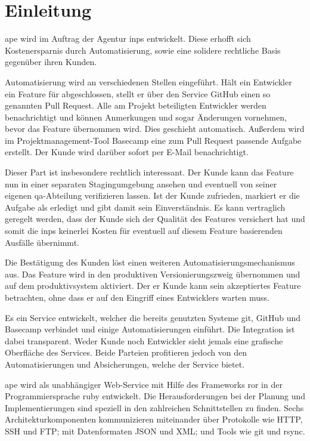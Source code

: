 \section{Einleitung} %
\label{sec:einleitung}

\gls{ape} wird im Auftrag der Agentur \gls{inps} entwickelt. Diese erhofft sich Kostenersparnis durch Automatisierung, sowie eine solidere rechtliche Basis gegenüber ihren Kunden.

Automatisierung wird an verschiedenen Stellen eingeführt. Hält ein Entwickler ein Feature für abgeschlossen, stellt er über den Service GitHub einen so genannten Pull Request. Alle am Projekt beteiligten Entwickler werden benachrichtigt und können Anmerkungen und sogar Änderungen vornehmen, bevor das Feature übernommen wird. Dies geschieht automatisch. Außerdem wird im Projektmanagement-Tool Basecamp eine zum Pull Request passende Aufgabe erstellt. Der Kunde wird darüber sofort per E-Mail benachrichtigt.

Dieser Part ist insbesondere rechtlich interessant. Der Kunde kann das Feature nun in einer separaten Stagingumgebung ansehen und eventuell von seiner eigenen \gls{qa}-Abteilung verifizieren lassen. Ist der Kunde zufrieden, markiert er die Aufgabe als erledigt und gibt damit sein Einverständnis. Es kann vertraglich geregelt werden, dass der Kunde sich der Qualität des Features versichert hat und somit die \gls{inps} keinerlei Kosten für eventuell auf diesem Feature basierenden Ausfälle übernimmt.

Die Bestätigung des Kunden löst einen weiteren Automatisierungsmechanismus aus. Das Feature wird in den produktiven Versionierungszweig übernommen und auf dem \gls{produktivsystem} aktiviert. Der er Kunde kann sein akzeptiertes Feature betrachten, ohne dass er auf den Eingriff eines Entwicklers warten muss.

Es ein Service entwickelt, welcher die bereits genutzten Systeme git, GitHub und Basecamp verbindet und einige Automatisierungen einführt. Die Integration ist dabei transparent. Weder Kunde noch Entwickler sieht jemals eine grafische Oberfläche des Services. Beide Parteien profitieren jedoch von den Automatisierungen und Absicherungen, welche der Service bietet.

\gls{ape} wird als unabhängiger Web-Service mit Hilfe des Frameworks \gls{ror} in der Programmiersprache \gls{ruby} entwickelt. Die Herausforderungen bei der Planung und Implementierungen sind speziell in den zahlreichen Schnittstellen zu finden. Sechs Architekturkomponenten kommunizieren miteinander über Protokolle wie HTTP, SSH und FTP; mit Datenformaten JSON und XML; und Tools wie git und rsync.

